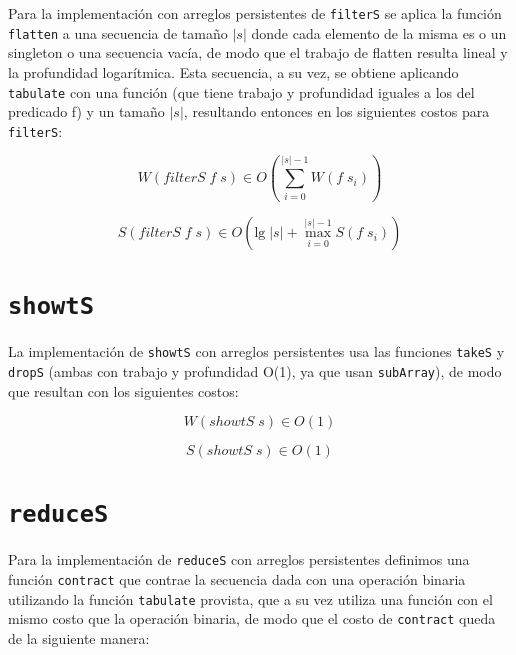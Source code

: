 \documentclass[a4paper,10pt]{article}
\begin{document}
Para la implementación con arreglos persistentes de \texttt{filterS} se aplica
la función \texttt{flatten} a una secuencia de tamaño $\vert s \vert$ donde cada
elemento de la misma es o un singleton o una secuencia vacía, de modo que el
trabajo de flatten resulta lineal y la profundidad logarítmica. Esta secuencia,
a su vez, se obtiene aplicando \texttt{tabulate} con una función (que tiene
trabajo y profundidad iguales a los del predicado f) y un tamaño $\vert s \vert$,
resultando entonces en los siguientes costos para \texttt{filterS}:

\begin{equation*}
    W \left( filterS \; f \; s \right) \in
    O \left( \sum_{i=0}^{\vert s \vert -1} W(f \; s_i) \right)
\end{equation*}

\begin{equation*}
    S \left( filterS \; f \; s \right) \in
    O \left( \text{lg} \; \vert s \vert + \max_{i=0}^{\vert s \vert -1} S(f \; s_i) \right)
\end{equation*}


\section*{\texttt{showtS}}

La implementación de \texttt{showtS} con arreglos persistentes usa las funciones
\texttt{takeS} y \texttt{dropS} (ambas con trabajo y profundidad O(1), ya que usan
\texttt{subArray}), de modo que resultan con los siguientes costos:

\begin{equation*}
    W \left( showtS \; s \right) \in
    O \left( 1 \right)
\end{equation*}

\begin{equation*}
    S \left( showtS \; s \right) \in
    O \left( 1 \right)
\end{equation*}


\section*{\texttt{reduceS}}

Para la implementación de \texttt{reduceS} con arreglos persistentes definimos
una función \texttt{contract} que contrae la secuencia dada con una operación
binaria utilizando la función \texttt{tabulate} provista, que a su vez utiliza
una función con el mismo costo que la operación binaria, de modo que el costo
de \texttt{contract} queda de la siguiente manera:
\end{document}
